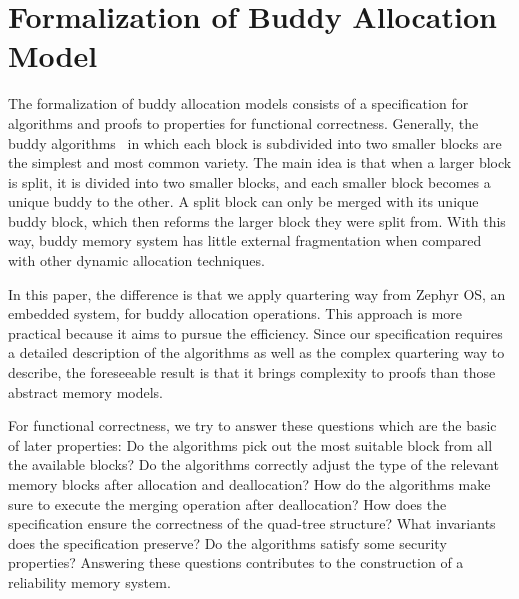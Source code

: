 \documentclass[runningheads]{llncs}
\begin{document}
\section{Formalization of Buddy Allocation Model}
The formalization of buddy allocation models consists of a specification for algorithms and proofs to properties for functional correctness. Generally, the buddy algorithms~\cite{reg_knowlton} in which each block is subdivided into two smaller blocks are the simplest and most common variety. The main idea is that when a larger block is split, it is divided into two smaller blocks, and each smaller block becomes a unique buddy to the other. A split block can only be merged with its unique buddy block, which then reforms the larger block they were split from. With this way, buddy memory system has little external fragmentation when compared with other dynamic allocation techniques.

In this paper, the difference is that we apply quartering way from Zephyr OS, an embedded system, for buddy allocation operations. This approach is more practical because it aims to pursue the efficiency. Since our specification requires a detailed description of the algorithms as well as the complex quartering way to describe, the foreseeable result is that it brings complexity to proofs than those abstract memory models. 

For functional correctness, we try to answer these questions which are the basic of later properties: Do the algorithms pick out the most suitable block from all the available blocks? Do the algorithms correctly adjust the type of the relevant memory blocks after allocation and deallocation? How do the algorithms make sure to execute the merging operation after deallocation? How does the specification ensure the correctness of the quad-tree structure? What invariants does the specification preserve? Do the algorithms satisfy some security properties? Answering these questions contributes to the construction of a reliability memory system.
\end{document}
